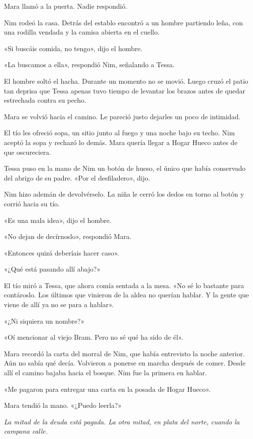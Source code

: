 \documentclass[10pt,a4paper]{article}
\begin{document}
Mara llamó a la puerta. Nadie respondió.

Nim rodeó la casa. Detrás del establo encontró a un hombre partiendo leña, con una rodilla vendada y la camisa abierta en el cuello.

«Si buscáis comida, no tengo», dijo el hombre.

«La buscamos a ella», respondió Nim, señalando a Tessa.

El hombre soltó el hacha. Durante un momento no se movió. Luego cruzó el patio tan deprisa que Tessa apenas tuvo tiempo de levantar los brazos antes de quedar estrechada contra su pecho.

Mara se volvió hacia el camino. Le pareció justo dejarles un poco de intimidad.

El tío les ofreció sopa, un sitio junto al fuego y una noche bajo su techo. Nim aceptó la sopa y rechazó lo demás. Mara quería llegar a Hogar Hueco antes de que oscureciera.

Tessa puso en la mano de Nim un botón de hueso, el único que había conservado del abrigo de su padre. «Por el desfiladero», dijo.

Nim hizo ademán de devolvérselo. La niña le cerró los dedos en torno al botón y corrió hacia su tío.

«Es una mala idea», dijo el hombre.

«No dejan de decírnoslo», respondió Mara.

«Entonces quizá deberíais hacer caso».

«¿Qué está pasando allí abajo?»

El tío miró a Tessa, que ahora comía sentada a la mesa. «No sé lo bastante para contároslo. Los últimos que vinieron de la aldea no querían hablar. Y la gente que viene de allí ya no se para a hablar».

«¿Ni siquiera un nombre?»

«Oí mencionar al viejo Bram. Pero no sé qué ha sido de él».

Mara recordó la carta del morral de Nim, que había entrevisto la noche anterior. Aún no sabía qué decía.
Volvieron a ponerse en marcha después de comer. Desde allí el camino bajaba hacia el bosque. Nim fue la primera en hablar.

«Me pagaron para entregar una carta en la posada de Hogar Hueco».

Mara tendió la mano. «¿Puedo leerla?»

\emph{La mitad de la deuda está pagada. La otra mitad, en plata del norte, cuando la campana calle.}
\end{document}
